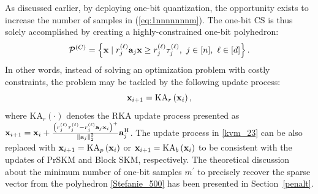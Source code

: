\documentclass[12pt,draftcls,onecolumn]{IEEEtran}
\begin{document}
As discussed earlier, by deploying one-bit quantization, the opportunity exists to increase the number of samples in (\ref{eq:1nnnnnnnm}). The one-bit CS is thus solely accomplished by creating a highly-constrained one-bit polyhedron:
\begin{equation}
\label{Stefanie_500}
\mathcal{P}^{(C)}=\left\{\mbx\mid r^{(\ell)}_{j}\mba_j\mbx\geq r^{(\ell)}_{j}\tau^{(\ell)}_{j},~ j\in[n],~\ell\in[d]\right\}.
\end{equation}
In other words, instead of solving an optimization problem with costly constraints, the problem may be tackled by 
the following update process:
\begin{equation}
\label{kvm_23}
\mbx_{i+1}=\mathrm{KA}_{r}\left(\mbx_i\right),
\end{equation}
where $\mathrm{KA}_r(\cdot)$ denotes the RKA update process presented as $\mathbf{x}_{i+1}=\mathbf{x}_i+\frac{\left(r^{(\ell)}_j\tau^{(\ell)}_j-r^{(\ell)}_j\mathbf{a}_j\mathbf{x}_i\right)^{+}}{\left\|\mathbf{a}_{j}\right\|^{2}_2} \mathbf{a}^{\mathrm{H}}_j$. The update process in \eqref{kvm_23} can be also replaced with $\mathbf{x}_{i+1}=\mathrm{KA}_{p}\left(\mathbf{x}_i\right)$ or $\mathbf{x}_{i+1}=\mathrm{KA}_{b}\left(\mathbf{x}_i\right)$ to be consistent with the updates of PrSKM and Block SKM, respectively. The theoretical discussion about the minimum number of one-bit samples $m^{\prime}$ to precisely recover the sparse vector from the polyhedron \eqref{Stefanie_500} has been presented in Section~\ref{penalt}.

\end{document}
